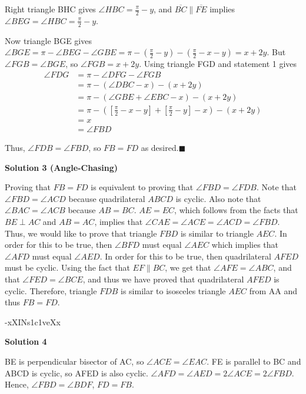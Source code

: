\begin{enumerate}
 Right triangle BHC gives $\angle HBC = \frac{\pi}{2}-y$, and $\overline{BC}\parallel \overline{FE}$ implies $\angle BEG=\angle HBC = \frac{\pi}{2}-y.$ 

 Now triangle BGE gives $\angle BGE = \pi - \angle BEG - \angle GBE = \pi - (\frac{\pi}{2}-y)-(\frac{\pi}{2}-x-y)=x+2y$. But $\angle FGB = \angle BGE$, so $\angle FGB=x+2y$. Using triangle FGD and statement 1 gives 
 \begin{align*}\angle FDG &= \pi - \angle DFG - \angle FGB \\ &= \pi - (\angle DBC - x) - (x + 2y) \\ &= \pi - (\angle GBE + \angle EBC - x) - (x + 2y) \\ &= \pi - ([\frac{\pi}{2}-x-y]+[\frac{\pi}{2}-y]-x)-(x+2y) \\ &= x \\ &= \angle FBD\end{align*}


 Thus, $\angle FDB = \angle FBD$, so $\boxed{FB=FD}$ as desired.$\blacksquare$




\textbf{Solution 3 (Angle-Chasing)}

Proving that $FB=FD$ is equivalent to proving that $\angle FBD= \angle FDB$. Note that $\angle FBD=\angle ACD$ because quadrilateral $ABCD$ is cyclic. Also note that $\angle BAC=\angle ACB$ because $AB=BC$. $AE=EC$, which follows from the facts that $BE \perp AC$ and $AB=AC$, implies that $\angle CAE= \angle ACE= \angle ACD= \angle FBD$. Thus, we would like to prove that triangle $FBD$ is similar to triangle $AEC$. In order for this to be true, then $\angle BFD$ must equal $\angle AEC$ which implies that $\angle AFD$ must equal $\angle AED$. In order for this to be true, then quadrilateral $AFED$ must be cyclic. Using the fact that $EF \parallel BC$, we get that $\angle AFE= \angle ABC$, and that $\angle FED= \angle BCE$, and thus we have proved that quadrilateral $AFED$ is cyclic. Therefore, triangle $FDB$ is similar to isosceles triangle $AEC$ from AA and thus $FB=FD$.

 -xXINs1c1veXx

 



\textbf{Solution 4}

BE is perpendicular bisector of AC, so $\angle ACE = \angle EAC$. FE is parallel to BC and ABCD is cyclic, so AFED is also cyclic. $\angle AFD = \angle AED = 2 \angle ACE = 2 \angle FBD$. Hence, $\angle FBD = \angle BDF$, $FD = FB$. 


\end{enumerate}
